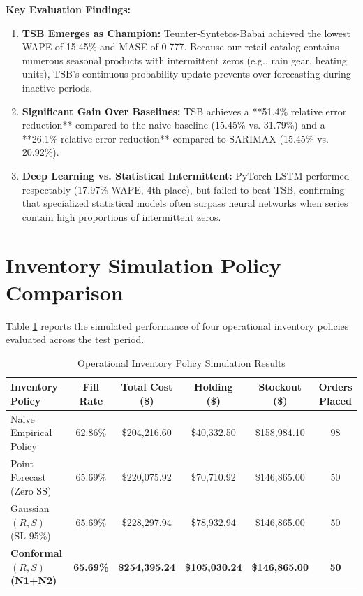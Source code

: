 \documentclass[12pt,a4paper,oneside]{report}
\theoremstyle{definition}
\begin{document}
\noindent \textbf{Key Evaluation Findings:}
\begin{enumerate}
    \item \textbf{TSB Emerges as Champion:} Teunter-Syntetos-Babai achieved the lowest WAPE of 15.45\% and MASE of 0.777. Because our retail catalog contains numerous seasonal products with intermittent zeros (e.g., rain gear, heating units), TSB's continuous probability update prevents over-forecasting during inactive periods.
    \item \textbf{Significant Gain Over Baselines:} TSB achieves a **51.4\% relative error reduction** compared to the naive baseline (15.45\% vs. 31.79\%) and a **26.1\% relative error reduction** compared to SARIMAX (15.45\% vs. 20.92\%).
    \item \textbf{Deep Learning vs. Statistical Intermittent:} PyTorch LSTM performed respectably (17.97\% WAPE, 4th place), but failed to beat TSB, confirming that specialized statistical models often surpass neural networks when series contain high proportions of intermittent zeros.
\end{enumerate}

\section{Inventory Simulation Policy Comparison}
Table \ref{tab:sim_results} reports the simulated performance of four operational inventory policies evaluated across the test period.

\begin{table}[H]
\centering
\caption{Operational Inventory Policy Simulation Results}
\label{tab:sim_results}
\begin{tabular}{lccccc}
\toprule
\textbf{Inventory Policy} & \textbf{Fill Rate} & \textbf{Total Cost (\$)} & \textbf{Holding (\$)} & \textbf{Stockout (\$)} & \textbf{Orders Placed} \\
\midrule
Naive Empirical Policy & 62.86\% & \$204,216.60 & \$40,332.50 & \$158,984.10 & 98 \\
Point Forecast (Zero SS) & 65.69\% & \$220,075.92 & \$70,710.92 & \$146,865.00 & 50 \\
Gaussian $(R, S)$ (SL 95\%) & 65.69\% & \$228,297.94 & \$78,932.94 & \$146,865.00 & 50 \\
\textbf{Conformal $(R, S)$ (N1+N2)} & \textbf{65.69\%} & \textbf{\$254,395.24} & \textbf{\$105,030.24} & \textbf{\$146,865.00} & \textbf{50} \\
\bottomrule
\end{tabular}
\end{table}
\end{document}
